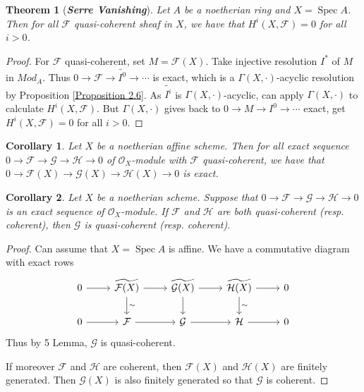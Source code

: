 \documentclass{ctexart}
\newtheorem{theorem}{Theorem}[section]
\newtheorem{corollary}{Corollary}[section]
\newcommand{\spec}{\operatorname{Spec}}
\begin{document}
\begin{theorem}[\textbf{\emph{Serre Vanishing}}]
    Let $A$ be a noetherian ring and $X = \spec A$.
    Then for all $\mathcal{F}$ quasi-coherent sheaf in $X$, we have that $H^{i}(X, \mathcal{F}) = 0$ for all $i > 0$.
    \label{Theorem 2.3}
\end{theorem}
\begin{proof}
    For $\mathcal{F}$ quasi-coherent, set $M = \mathcal{F}(X)$.
    Take injective resolution $I^{\ast}$ of $M$ in $Mod_{A}$.
    Thus $0 \longrightarrow \mathcal{F} \longrightarrow \widetilde{I^{0}} \longrightarrow \cdots$ is exact, which is a $\Gamma(X, \cdot)$-acyclic resolution by Proposition \ref{Proposition 2.6}.
    As $\widetilde{I^{i}}$ is $\Gamma(X, \cdot)$-acyclic, can apply $\Gamma(X, \cdot)$ to calculate $H^{i}(X, \mathcal{F})$.
    But $\Gamma(X, \cdot)$ gives back to $0 \longrightarrow M \longrightarrow I^{0} \longrightarrow \cdots$ exact, get $H^{i}(X, \mathcal{F}) = 0$ for all $i > 0$. 
\end{proof}
\begin{corollary}
    Let $X$ be a noetherian affine scheme.
    Then for all exact sequence $0 \longrightarrow \mathcal{F} \longrightarrow \mathcal{G} \longrightarrow \mathcal{H} \longrightarrow 0$ of $\mathcal{O}_{X}$-module with $\mathcal{F}$ quasi-coherent,
    we have that $0 \longrightarrow \mathcal{F}(X) \longrightarrow \mathcal{G}(X) \longrightarrow \mathcal{H}(X) \longrightarrow 0$ is exact.
    \label{Corollary 2.4}
\end{corollary}
\begin{corollary}
    Let $X$ be a noetherian scheme.
    Suppose that $0 \longrightarrow \mathcal{F} \longrightarrow \mathcal{G} \longrightarrow \mathcal{H} \longrightarrow 0$ is an exact sequence of $\mathcal{O}_{X}$-module.
    If $\mathcal{F}$ and $\mathcal{H}$ are both quasi-coherent (resp. coherent), then $\mathcal{G}$ is quasi-coherent (resp. coherent).
    \label{Corollary 2.5} 
\end{corollary}
\begin{proof}
    Can assume that $X = \spec A$ is affine.
    We have a commutative diagram with exact rows
    \begin{equation}
        \begin{tikzcd}
            0 \arrow[r] &
            \widetilde{\mathcal{F}(X)} \arrow[r] \arrow[d, "\sim"] &
            \widetilde{\mathcal{G}(X)} \arrow[r] \arrow[d] &
            \widetilde{\mathcal{H}(X)} \arrow[r] \arrow[d, "\sim"] & 
            0 \\
            0 \arrow[r] &
            \mathcal{F} \arrow[r] &
            \mathcal{G} \arrow[r] &
            \mathcal{H} \arrow[r] & 
            0
        \end{tikzcd}
    \end{equation}
    Thus by 5 Lemma, $\mathcal{G}$ is quasi-coherent.
    \par
    If moreover $\mathcal{F}$ and $\mathcal{H}$ are coherent, then $\mathcal{F}(X)$ and $\mathcal{H}(X)$ are finitely generated.
    Then $\mathcal{G}(X)$ is also finitely generated so that $\mathcal{G}$ is coherent.
\end{proof}
\end{document}
